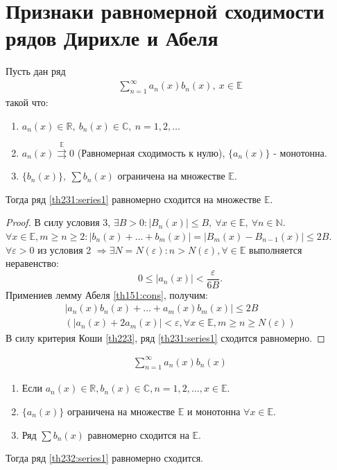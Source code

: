\section{Признаки равномерной сходимости рядов Дирихле и Абеля}
\begin{theorem}
  Пусть дан ряд
  \begin{gather}
    \sum\limits_{n = 1}^{\infty} a_n(x) b_n(x), \ x \in \mathbb{E} \label{th231:series1}
  \end{gather}
  такой что:
  \begin{enumerate}
    \item $a_n(x) \in \mathbb{R}, \ b_n(x) \in \mathbb{C}, \ n = 1, 2, \dots$
    \item $a_n(x) \stackrel{\mathrm{\mathbb{E}}}{\rightrightarrows} 0$
      (Равномерная сходимость к нулю), $\{a_n(x)\}$ - монотонна.
    \item $\{b_n(x)\}, \ \sum b_n(x)$ ограничена на множестве $\mathbb{E}$.
  \end{enumerate}
  Тогда ряд \ref{th231:series1} равномерно сходится на множестве $\mathbb{E}$.
\end{theorem}

\begin{proof}
  В силу условия 3, $\exists B > 0: |B_n(x)| \leq B, \ \forall x \in \mathbb{E}, \
  \forall n \in \mathbb{N}$. \\
  $\forall x \in \mathbb{E}, m \geq n \geq 2: |b_n(x) + \dots + b_m(x)| =
  |B_m(x) - B_{n-1}(x)| \leq 2B$. \\
  $\forall \varepsilon > 0$ из условия 2 $\Rightarrow \exists N = N(\varepsilon):
  n > N(\varepsilon), \forall \in \mathbb{E}$ выполняется неравенство:
  $$0 \leq |a_n(x)| < \frac{\varepsilon}{6B}.$$
  Примениев лемму Абеля \ref{th151:cons}, получим:
  \begin{gather*}
    |a_n(x) b_n(x) + \dots + a_m(x) b_m(x)| \leq 2B \\
    (|a_n(x) + 2a_m(x)| < \varepsilon, \forall x \in \mathbb{E},
    m \geq n \geq N(\varepsilon))
  \end{gather*}
  В силу критерия Коши \ref{th223}, ряд \ref{th231:series1} сходится равномерно.
\end{proof}

\begin{theorem}
  \label{th232}
  \begin{gather}
    \sum\limits_{n = 1}^{\infty} a_n(x) b_n(x) \label{th232:series1}
  \end{gather}
  \begin{enumerate}
    \item Если $a_n(x) \in \mathbb{R}, b_n(x) \in \mathbb{C}, n = 1, 2, \dots,
      x \in \mathbb{E}$.
    \item $\{a_n(x)\}$ ограничена на множестве $\mathbb{E}$ и монотонна
      $\forall x \in \mathbb{E}$.
    \item Ряд $\sum b_n(x)$ равномерно сходится на $\mathbb{E}$.
  \end{enumerate}
  Тогда ряд \ref{th232:series1} равномерно сходится.
\end{theorem}

